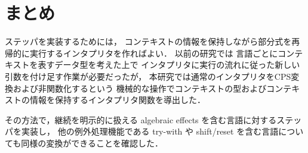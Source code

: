 \section{まとめ}
\label{section:conclusion}

ステッパを実装するためには，
コンテキストの情報を保持しながら部分式を再帰的に実行するインタプリタを作ればよい．
以前の研究\cite{FCA19}では
言語ごとにコンテキストを表すデータ型を考えた上で
インタプリタに実行の流れに従った新しい引数を付け足す作業が必要だったが，
本研究では通常のインタプリタをCPS変換および非関数化するという
機械的な操作でコンテキストの型およびコンテキストの情報を保持するインタプリタ関数を導出した．

その方法で，継続を明示的に扱える algebraic effects を含む言語に対するステッパを実装し，
他の例外処理機能である try-with や shift/reset を含む言語についても同様の変換ができることを確認した．
